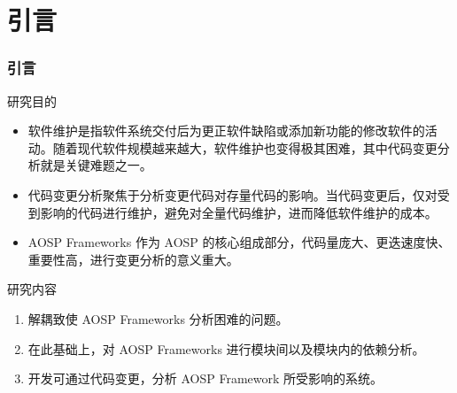 %
%
%
%
\section{引言}
    \begin{frame}
    \frametitle{引言}
        \footnotesize
        \begin{block}{研究目的}
            \begin{itemize}
                \item 软件维护是指软件系统交付后为更正软件缺陷或添加新功能的修改软件的活动。随着现代软件规模越来越大，软件维护也变得极其困难，其中代码变更分析就是关键难题之一。
                \item 代码变更分析聚焦于分析变更代码对存量代码的影响。当代码变更后，仅对受到影响的代码进行维护，避免对全量代码维护，进而降低软件维护的成本。
                \item AOSP Frameworks 作为 AOSP 的核心组成部分，代码量庞大、更迭速度快、重要性高，进行变更分析的意义重大。
            \end{itemize}
        \end{block}

        \begin{block}{研究内容}
            \begin{enumerate}
                \item 解耦致使 AOSP Frameworks 分析困难的问题。
                \item 在此基础上，对 AOSP Frameworks 进行模块间以及模块内的依赖分析。
                \item 开发可通过代码变更，分析 AOSP Framework 所受影响的系统。
            \end{enumerate}
        \end{block}
    \end{frame}

